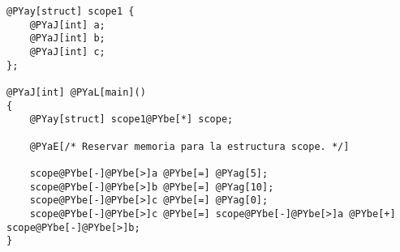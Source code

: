 \begin{Verbatim}[commandchars=@\[\]]
@PYay[struct] scope1 {
    @PYaJ[int] a;
    @PYaJ[int] b;
    @PYaJ[int] c;
};

@PYaJ[int] @PYaL[main]()
{
    @PYay[struct] scope1@PYbe[*] scope;
    
    @PYaE[/* Reservar memoria para la estructura scope. */]

    scope@PYbe[-]@PYbe[>]a @PYbe[=] @PYag[5];
    scope@PYbe[-]@PYbe[>]b @PYbe[=] @PYag[10];
    scope@PYbe[-]@PYbe[>]c @PYbe[=] @PYag[0];
    scope@PYbe[-]@PYbe[>]c @PYbe[=] scope@PYbe[-]@PYbe[>]a @PYbe[+] scope@PYbe[-]@PYbe[>]b;
}
\end{Verbatim}
